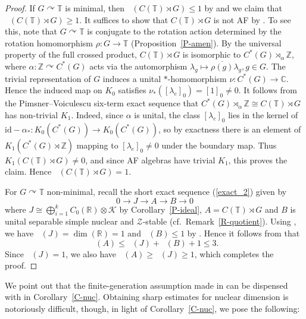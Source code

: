 \documentclass[11pt,a4paper,leqno]{amsart}
\theoremstyle{definition}
\theoremstyle{remark}
\numberwithin{equation}{section}
\theoremstyle{plain}
\DeclareMathOperator{\nucdim}{\dim_{\operatorname{nuc}}}
\newcommand{\Zb}{\mathbb{Z}}
\newcommand{\Cb}{\mathbb{C}}
\newcommand{\Tb}{\mathbb{T}}
\newcommand{\Rb}{\mathbb{R}}
\newcommand{\Zc}{\mathcal{Z}}
\newcommand{\Kc}{\mathcal{K}}
\begin{document}
\begin{proof}
    If $G\curvearrowright \Tb$ is minimal, then $\nucdim(C(\Tb)\rtimes G) \le 1$ by \cite[Theorem B]{Casetal21} and we claim that $\nucdim(C(\Tb)\rtimes G) \ge 1$. It suffices to show that $C(\Tb)\rtimes G$ is not AF by \cite[Remark 2.2~(iii)]{WinZac10}. To see this, note that $G\curvearrowright \Tb$ is conjugate to the rotation action determined by the rotation homomorphism $\rho : G \to \Tb$ (Proposition~\ref{P-amen}). By the universal property of the full crossed product, $C(\Tb)\rtimes G$ is isomorphic to $C^*(G)\rtimes_\alpha \Zb$, where $\alpha : \Zb \curvearrowright C^*(G)$ acts via the automorphism $\lambda_g \mapsto \overline{\rho(g)}\lambda_g, g\in G$. The trivial representation of $G$ induces a unital $*$-homomorphism $\nu : C^*(G) \to \Cb$. Hence the induced map on $K_0$ satisfies $\nu_*([\lambda_{e}]_0) = [1]_0 \ne 0$. It follows from the Pimsner--Voiculescu six-term exact sequence \cite{PimVoi80} that $C^*(G)\rtimes_\alpha \Zb \cong C(\Tb)\rtimes G$ has non-trivial $K_1$. Indeed, since $\alpha$ is unital, the class $[\lambda_e]_0$ lies in the kernel of $\mathrm{id}-\alpha_* \colon K_0(C^*(G))\to K_0(C^*(G))$, so by exactness there is an element of $K_1(C^*(G)\rtimes \mathbb Z)$ mapping to $[\lambda_e]_0 \ne 0$ under the boundary map. Thus $K_1(C(\mathbb T)\rtimes G)\neq 0$, and since AF algebras have trivial $K_1$, this proves the claim. Hence $\nucdim(C(\Tb)\rtimes G) = 1$. 
    
    For $G\curvearrowright \Tb$ non-minimal, recall the short exact sequence (\ref{exact_2}) given by 
    \[
        0 \longrightarrow J \longrightarrow A \longrightarrow B \longrightarrow 0
    \]
    where $J\cong \bigoplus_{i=1}^k C_0(\Rb)\otimes \Kc$ by Corollary~\ref{P-ideal}, $A = C(\Tb)\rtimes G$ and $B$ is unital separable simple nuclear and $\Zc$-stable \cite{Ker20} (cf.~Remark~\ref{R-quotient}). Using \cite[Corollary 2.10]{WinZac10}, we have $\nucdim(J) = \dim(\Rb) = 1$ and $\nucdim(B) \le 1$ by \cite[Theorem B]{Casetal21}. Hence it follows from \cite[Proposition 2.9]{WinZac10} that 
    \[
        \nucdim(A) \le \nucdim(J) + \nucdim(B) + 1 \le 3.
    \]
    Since $\nucdim(J) = 1$, we also have $\nucdim(A)\ge \nucdim(J) \ge 1$, which completes the proof. 
\end{proof}

We point out that the finite-generation assumption made in \cite{SzaWuZac19} can be dispensed with in Corollary~\ref{C-nuc}. Obtaining sharp estimates for nuclear dimension is notoriously difficult, though, in light of Corollary~\ref{C-nuc}, we pose the following:
\end{document}
